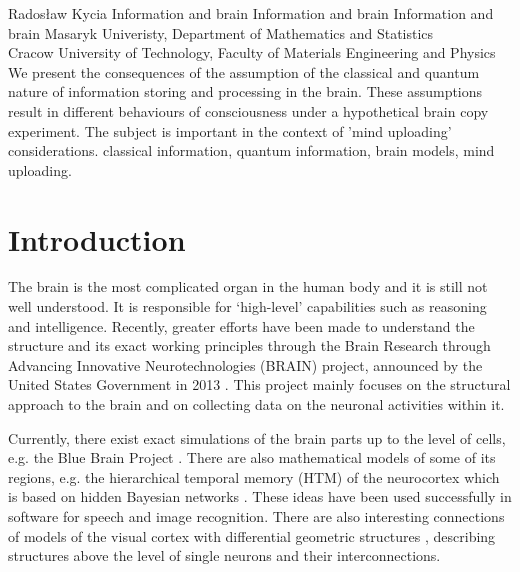 \begin{artengenv}{Radosław Kycia}
	{Information and brain}
	{Information and brain}
	{Information and brain}
	{Masaryk Univeristy, Department of Mathematics and Statistics\\
	Cracow University of Technology, Faculty of Materials Engineering and Physics\label{kycia_anfang}}
	{We present the consequences of the assumption of the classical and quantum nature of information storing and processing in the brain. These assumptions result in different behaviours of consciousness under a hypothetical brain copy experiment. The subject is important in the context of 'mind uploading' considerations.}
	{classical information, quantum information, brain models, mind uploading.}
	
	


\section{Introduction}
The brain is the most complicated organ in the human body and it is still not well understood. It is responsible for `high-level' capabilities such as reasoning and intelligence. Recently, greater efforts have been made to understand the structure and its exact working principles through the Brain Research through Advancing Innovative Neurotechnologies (BRAIN) project, announced by the United States Government in 2013 \parencite{BRAINInitiative}. This project mainly focuses on the structural approach to the brain and on collecting data on the neuronal activities within it.

Currently, there exist exact simulations of the brain parts up to the level of cells, e.g. the Blue Brain Project \parencite{BlueBrainProject}. There are also mathematical models of some of its regions, e.g. the hierarchical temporal memory (HTM) of the neurocortex \parencite{CortexModel1, CortexModel2} which is based on hidden Bayesian networks \parencite{KurzweilHowToCreateBrain}. These ideas have been used successfully in software for speech and image recognition. There are also interesting connections of models of the visual cortex with differential geometric structures \parencite{VisualCortex}, describing structures above the level of single neurons and their interconnections.


\end{artengenv}

